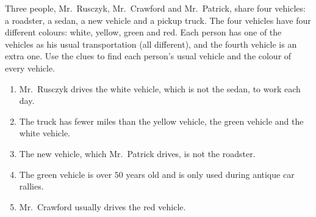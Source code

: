 Three people, Mr.\ Rusczyk, Mr.\ Crawford and Mr.\ Patrick, share four vehicles: a roadster, a sedan, a new vehicle and a pickup truck. The four vehicles have four different colours: white, yellow, green and red. Each person has one of the vehicles as his usual transportation (all different), and the fourth vehicle is an extra one. Use the clues to find each person's usual vehicle and the colour of every vehicle.
\begin{enumerate}
\item Mr.\ Rusczyk drives the white vehicle, which is not the sedan, to work each day.
\item The truck has fewer miles than the yellow vehicle, the green vehicle and the white vehicle.
\item The new vehicle, which Mr.\ Patrick drives, is not the roadster.
\item The green vehicle is over $50$ years old and is only used during antique car rallies.
\item Mr.\ Crawford usually drives the red vehicle.
\end{enumerate}
